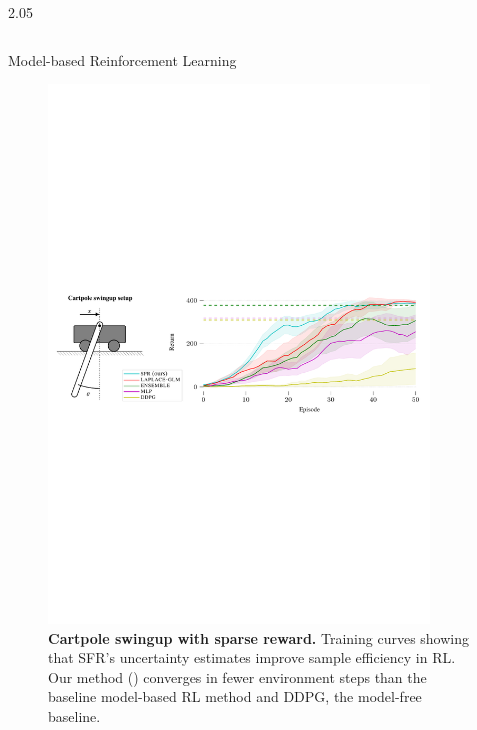 \documentclass[final,12pt]{beamer}
\newlength{\colwidth}
\newcommand{\our}{SFR}
\begin{document}
\begin{frame}[t]
\begin{columns}[t]
\begin{column}{2.05\colwidth}
\begin{columns}[t]
\begin{column}{\colwidth}
\begin{block}{Model-based Reinforcement Learning}

        \begin{figure}[!t]
        \centering\scriptsize
        \includegraphics[width=0.9\textwidth]{fig/rl.pdf}
        \caption{\footnotesize \textbf{Cartpole swingup with sparse reward.} Training curves showing that \our's uncertainty estimates improve sample efficiency in RL.
        Our method () converges in fewer environment steps than the baseline model-based RL method and DDPG, the model-free baseline.}
        \label{fig:rl}
        \end{figure}


\end{block}
\end{column}
\end{columns}
\end{column}
\end{columns}
\end{frame}
\end{document}
